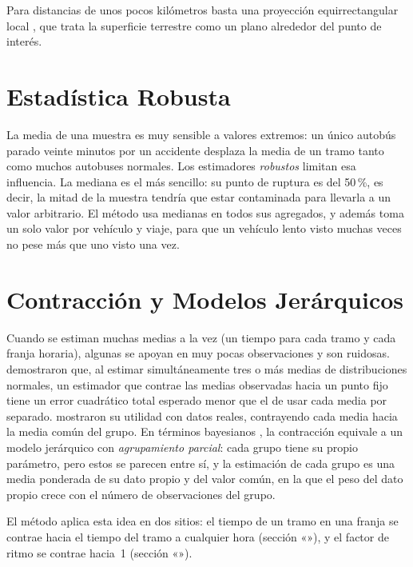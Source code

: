 Para distancias de unos pocos kilómetros basta una proyección equirrectangular local \citep{snyder1987}, que trata la
superficie terrestre como un plano alrededor del punto de interés.

\section{Estadística Robusta}

La media de una muestra es muy sensible a valores extremos: un único autobús parado veinte minutos por un accidente
desplaza la media de un tramo tanto como muchos autobuses normales. Los estimadores \emph{robustos}
\citep{huber1964,tukey1977} limitan esa influencia. La mediana es el más sencillo: su punto de ruptura es del 50\,\%,
es decir, la mitad de la muestra tendría que estar contaminada para llevarla a un valor arbitrario. El método usa
medianas en todos sus agregados, y además toma un solo valor por vehículo y viaje, para que un vehículo lento visto
muchas veces no pese más que uno visto una vez.

\section{Contracción y Modelos Jerárquicos}
\label{sec:marco-contraccion}

Cuando se estiman muchas medias a la vez (un tiempo para cada tramo y cada franja horaria), algunas se apoyan en muy
pocas observaciones y son ruidosas. \citet{jamesstein1961} demostraron que, al estimar simultáneamente tres o más medias de
distribuciones normales, un estimador que contrae las medias observadas hacia un punto fijo tiene un error cuadrático
total esperado menor que el de usar cada media por separado. \citet{efronmorris1975} mostraron su utilidad con datos
reales, contrayendo cada media hacia la media común del grupo. En términos bayesianos
\citep{gelman2013}, la contracción equivale a un modelo jerárquico con \emph{agrupamiento parcial}: cada grupo tiene su
propio parámetro, pero estos se parecen entre sí, y la estimación de cada grupo es una media ponderada de su dato
propio y del valor común, en la que el peso del dato propio crece con el número de observaciones del grupo.

El método aplica esta idea en dos sitios: el tiempo de un tramo en una franja se contrae hacia el tiempo del tramo a
cualquier hora (sección «»), y el factor de ritmo se contrae hacia~1 (sección «»).

